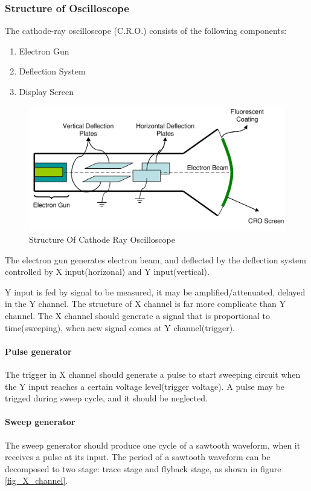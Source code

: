\subsubsection{Structure of Oscilloscope}
The cathode-ray oscilloscope (C.R.O.) consists of the following components:
\begin{enumerate}
  \item Electron Gun
  \item Deflection System
  \item Display Screen
\end{enumerate}

\begin{figure}
  \centering
  \includegraphics[width=4.5in]{fig/fig_cro.png}
  \caption{Structure Of Cathode Ray Oscilloscope}\label{fig_crc}
\end{figure}

The electron gun generates electron beam, and deflected by the deflection system controlled by X input(horizonal) and Y input(vertical).

Y input is fed by signal to be measured, it may be amplified/attenuated, delayed in the Y channel. The structure of X channel is far more complicate than Y channel. The X channel should generate a signal that is proportional to time(sweeping), when new signal comes at Y channel(trigger).

\paragraph{Pulse generator} The trigger in X channel should generate a pulse to start sweeping circuit when the Y input reaches a certain voltage level(trigger voltage). A pulse may be trigged during sweep cycle, and it should be neglected.

\paragraph{Sweep generator} The sweep generator should produce one cycle of a sawtooth waveform, when it receives a pulse at its input. The period of a sawtooth waveform can be decomposed to two stage: trace stage and flyback stage, as shown in figure \ref{fig_X_channel}.

